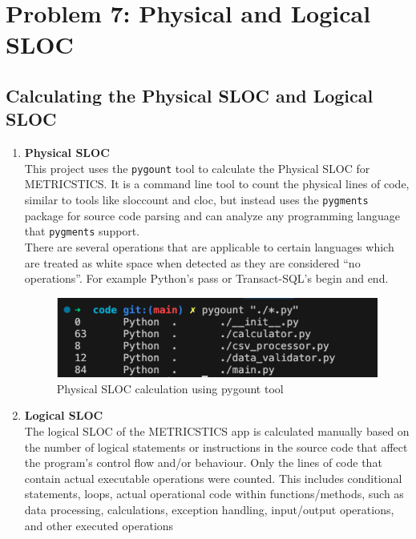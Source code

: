 \section{Problem 7: Physical and Logical SLOC}

\subsection{Calculating the Physical SLOC and Logical SLOC}

\begin{enumerate}
\item \textbf{Physical SLOC} \\
This project uses the \texttt{pygount} tool to calculate the Physical SLOC for METRICSTICS. It is a command line tool to count the physical lines of code, similar to tools like sloccount and cloc, but instead uses the \texttt{pygments} package for source code parsing and can analyze any programming language that \texttt{pygments} support.\cite{pygount}\\
There are several operations that are applicable to certain languages which are treated as white space when detected as they are considered “no operations”. For example Python’s pass or Transact-SQL’s begin and end.

\begin{figure}[!htb]
    \centering
    \includegraphics[width=12cm]{images/physicalsloc.png}
    \caption{Physical SLOC calculation using pygount tool}
\end{figure}

\item \textbf{Logical SLOC} \\
The logical SLOC of the METRICSTICS app is calculated manually based on the number of logical statements or instructions in the source code that affect the program's control flow and/or behaviour.
Only the lines of code that contain actual executable operations were counted. This includes conditional statements, loops, actual operational code within functions/methods, such as data processing, calculations, exception handling, input/output operations, and other executed operations

\vspace{12pt}


\end{enumerate}
